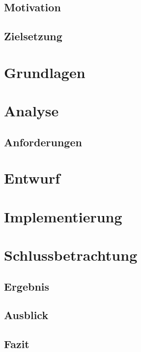 \documentclass[12pt]{article}
\begin{document}
\subsection{Motivation}

\subsection{Zielsetzung}

\newpage
\section{Grundlagen}

\newpage
\section{Analyse}

\subsection{Anforderungen}

\newpage
\section{Entwurf}

\newpage
\section{Implementierung}

\newpage
\section{Schlussbetrachtung}

\subsection{Ergebnis}

\subsection{Ausblick}

\subsection{Fazit}

\newpage
\printglossary[title=Glossar, toctitle=Glossar]

\newpage
\listoffigures

\newpage
\printbibliography[title=Quellenverzeichnis,heading=bibintoc]
\end{document}
